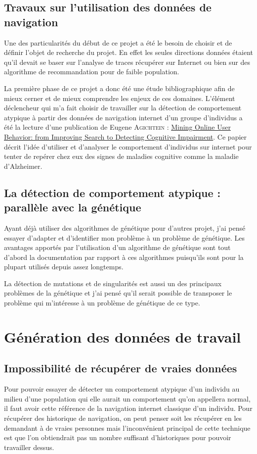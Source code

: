 \documentclass[a4paper, 11pt]{article}
\begin{document}
\subsection{Travaux sur l'utilisation des données de navigation}
Une des particularités du début de ce projet a été le besoin de choisir et de définir l'objet de recherche du projet. En effet les seules directions données étaient qu'il devait se baser sur l'analyse de traces récupérer sur Internet ou bien sur des algorithme de recommandation pour de faible population.

La première phase de ce projet a donc été une étude bibliographique afin de mieux cerner et de mieux comprendre les enjeux de ces domaines. L'élément déclencheur qui m'a fait choisir de travailler sur la détection de comportement atypique à partir des données de navigation internet d'un groupe d'individus a été la lecture d'une publication de Eugene A\textsc{gichtein} : \href{http://www.cse.lehigh.edu/academics/graduate-programs/graduate-computer-engineering/2-uncategorised/235-agichtein}{Mining Online User Behavior: from Improving Search to Detecting Cognitive Impairment}. Ce papier décrit l'idée d'utiliser et d'analyser le comportement d'individus sur internet pour tenter de repérer chez eux des signes de maladies cognitive comme la maladie d'Alzheimer.

\subsection{La détection de comportement atypique : parallèle avec la génétique}

Ayant déjà utiliser des algorithmes de génétique pour d'autres projet, j'ai pensé essayer d'adapter et d'identifier mon problème à un problème de génétique. Les avantages apportés par l'utilisation d'un algorithme de génétique sont tout d'abord la documentation par rapport à ces algorithmes puisqu'ils sont pour la plupart utilisés depuis assez longtemps. 

La détection de mutations et de singularités est aussi un des principaux problèmes de la génétique et j'ai pensé qu'il serait possible de transposer le problème qui m'intéresse à un problème de génétique de ce type.

\section{Génération des données de travail}

\subsection{Impossibilité de récupérer de vraies données}
Pour pouvoir essayer de détecter un comportement atypique d'un individu au milieu d'une population qui elle aurait un comportement qu'on appellera normal, il faut avoir cette référence de la navigation internet classique d'un individu. Pour récupérer des historique de navigation, on peut penser soit les récupérer en les demandant à de vraies personnes mais l'inconvénient principal de cette technique est que l'on obtiendrait pas un nombre suffisant d'historiques pour pouvoir travailler dessus. 
\end{document}
